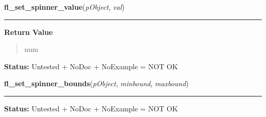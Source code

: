     \label{xformslib:library:fl_set_spinner_value}

    \vspace{0.5ex}

\hspace{.8\funcindent}\begin{boxedminipage}{\funcwidth}

    \raggedright \textbf{fl\_set\_spinner\_value}(\textit{pObject}, \textit{val})

    \vspace{-1.5ex}

    \rule{\textwidth}{0.5\fboxrule}
\setlength{\parskip}{2ex}
\setlength{\parskip}{1ex}
      \textbf{Return Value}
    \vspace{-1ex}

      \begin{quote}
      num

      \end{quote}

\textbf{Status:} Untested + NoDoc + NoExample = NOT OK



    \end{boxedminipage}

    \label{xformslib:library:fl_set_spinner_bounds}

    \vspace{0.5ex}

\hspace{.8\funcindent}\begin{boxedminipage}{\funcwidth}

    \raggedright \textbf{fl\_set\_spinner\_bounds}(\textit{pObject}, \textit{minbound}, \textit{maxbound})

    \vspace{-1.5ex}

    \rule{\textwidth}{0.5\fboxrule}
\setlength{\parskip}{2ex}
\setlength{\parskip}{1ex}
\textbf{Status:} Untested + NoDoc + NoExample = NOT OK



    \end{boxedminipage}

    \label{xformslib:library:fl_get_spinner_bounds}

